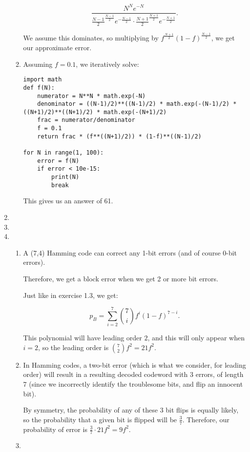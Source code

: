 \begin{enumerate}[label=1.\arabic*]
\begin{enumerate}
          \[
          \frac{N^Ne^{-N}}{\frac{N-1}{2}^{\frac{N-1}{2}} e^{-\frac{N-1}{2}} \cdot \frac{N+1}{2}^{\frac{N+1}{2}} e^{-\frac{N+1}{2}}}
          .\] 

          We assume this dominates, so multiplying by $f^{\frac{N+1}{2}}(1-f)^{\frac{N-1}{2}}$, we get our approximate error.

        \item
          Assuming $f=0.1$, we iteratively solve:

\begin{verbatim}
import math
def f(N):
    numerator = N**N * math.exp(-N)
    denominator = ((N-1)/2)**((N-1)/2) * math.exp(-(N-1)/2) * ((N+1)/2)**((N+1)/2) * math.exp(-(N+1)/2)
    frac = numerator/denominator
    f = 0.1
    return frac * (f**((N+1)/2)) * (1-f)**((N-1)/2)

for N in range(1, 100):
    error = f(N)
    if error < 10e-15:
        print(N)
        break
\end{verbatim}

This gives us an answer of 61.

    \end{enumerate}

  \item
  \item
  \item
    \begin{enumerate}
      \item
        A (7,4) Hamming code can correct any 1-bit errors (and of course 0-bit errors).

        Therefore, we get a block error when we get 2 or more bit errors.

        Just like in exercise 1.3, we get:

        \[
          p_B = \sum_{i=2}^7 \binom{7}{i} f^i(1-f)^{7-i}
        .\] 

        This polynomial will have leading order $2$, and this will only appear when $i=2$, so the leading order is $\binom{7}{2}f^2 = 21f^2$.

      \item
        In Hamming codes, a two-bit error (which is what we consider, for leading order) will result in a resulting decoded codeword with 3 errors, of length 7 (since we incorrectly identify the troublesome bits, and flip an innocent bit).

        By symmetry, the probability of any of these 3 bit flips is equally likely, so the probability that a given bit is flipped will be $\frac{3}{7}$. Therefore, our probability of error is $\frac{3}{7} \cdot 21 f^2 = 9f^2$.
      \item



\end{enumerate}
\end{enumerate}

